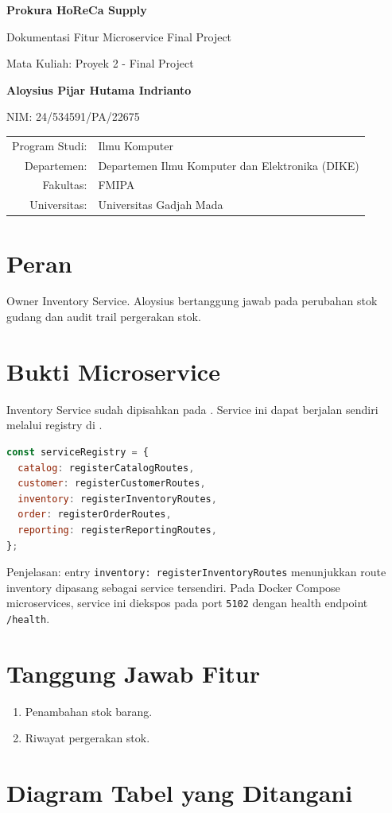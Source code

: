 \documentclass[11pt,a4paper]{article}
\newcommand{\docheader}[2]{
\begin{titlepage}
\centering
{\Large\bfseries Prokura HoReCa Supply\par}
\vspace{0.4cm}
{\large Dokumentasi Fitur Microservice Final Project\par}
\vspace{0.8cm}
{\large Mata Kuliah: Proyek 2 - Final Project\par}
\vspace{1.2cm}
{\large\bfseries #1\par}
{\large NIM: #2\par}
\vfill
\begin{tabular}{rl}
Program Studi: & Ilmu Komputer\\
Departemen: & Departemen Ilmu Komputer dan Elektronika (DIKE)\\
Fakultas: & FMIPA\\
Universitas: & Universitas Gadjah Mada\\
\end{tabular}
\vfill
\end{titlepage}
}
\begin{document}
\docheader{Aloysius Pijar Hutama Indrianto}{24/534591/PA/22675}

\section*{Peran}
Owner Inventory Service. Aloysius bertanggung jawab pada perubahan stok gudang dan audit trail pergerakan stok.

\section*{Bukti Microservice}
Inventory Service sudah dipisahkan pada . Service ini dapat berjalan sendiri melalui registry di .

\begin{lstlisting}[language=JavaScript]
const serviceRegistry = {
  catalog: registerCatalogRoutes,
  customer: registerCustomerRoutes,
  inventory: registerInventoryRoutes,
  order: registerOrderRoutes,
  reporting: registerReportingRoutes,
};
\end{lstlisting}

Penjelasan: entry \texttt{inventory: registerInventoryRoutes} menunjukkan route inventory dipasang sebagai service tersendiri. Pada Docker Compose microservices, service ini diekspos pada port \texttt{5102} dengan health endpoint \texttt{/health}.

\section*{Tanggung Jawab Fitur}
\begin{enumerate}
\item Penambahan stok barang.
\item Riwayat pergerakan stok.
\end{enumerate}

\section*{Diagram Tabel yang Ditangani}
\begin{center}
\end{center}
\end{document}
